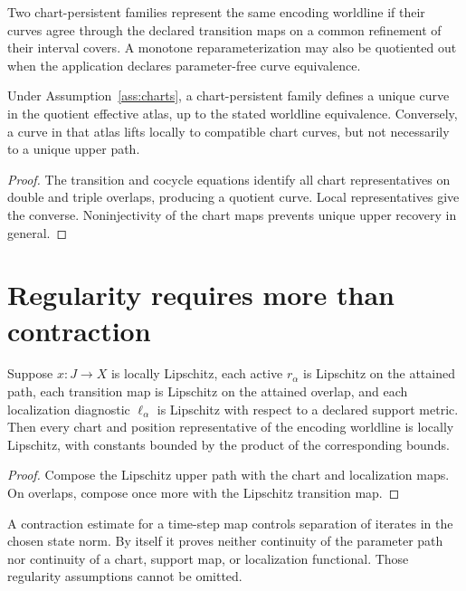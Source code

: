 \documentclass[11pt]{article}
\begin{document}
\begin{definition}
Two chart-persistent families represent the same encoding worldline if their
curves agree through the declared transition maps on a common refinement of
their interval covers. A monotone reparameterization may also be quotiented out
when the application declares parameter-free curve equivalence.
\end{definition}

\begin{theorem}\label{thm:gluing}
Under Assumption~\ref{ass:charts}, a chart-persistent family defines a unique
curve in the quotient effective atlas, up to the stated worldline equivalence.
Conversely, a curve in that atlas lifts locally to compatible chart curves,
but not necessarily to a unique upper path.
\end{theorem}

\begin{proof}
The transition and cocycle equations identify all chart representatives on
double and triple overlaps, producing a quotient curve. Local representatives
give the converse. Noninjectivity of the chart maps prevents unique upper
recovery in general.
\end{proof}

\section{Regularity requires more than contraction}

\begin{theorem}\label{thm:regularity}
Suppose $x:J\to X$ is locally Lipschitz, each active $r_\alpha$ is Lipschitz on
the attained path, each transition map is Lipschitz on the attained overlap,
and each localization diagnostic $\ell_\alpha$ is Lipschitz with respect to a
declared support metric. Then every chart and position representative of the
encoding worldline is locally Lipschitz, with constants bounded by the product
of the corresponding bounds.
\end{theorem}

\begin{proof}
Compose the Lipschitz upper path with the chart and localization maps. On
overlaps, compose once more with the Lipschitz transition map.
\end{proof}

A contraction estimate for a time-step map controls separation of iterates in
the chosen state norm. By itself it proves neither continuity of the parameter
path nor continuity of a chart, support map, or localization functional. Those
regularity assumptions cannot be omitted.
\end{document}
